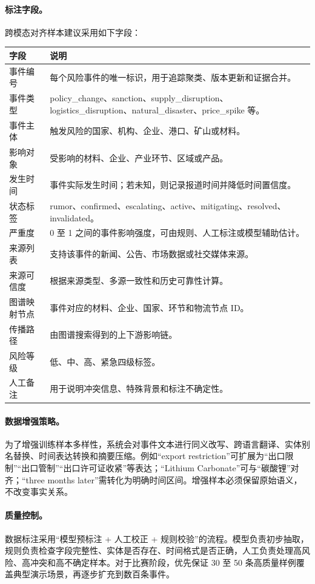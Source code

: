 ﻿\documentclass[12pt,a4paper]{article}
\begin{document}
\paragraph{标注字段。}跨模态对齐样本建议采用如下字段：
\begin{longtable}{p{}p{}}
\toprule
\textbf{字段} & \textbf{说明} \\
\midrule
事件编号 & 每个风险事件的唯一标识，用于追踪聚类、版本更新和证据合并。 \\
事件类型 & policy\_change、sanction、supply\_disruption、logistics\_disruption、natural\_disaster、price\_spike 等。 \\
事件主体 & 触发风险的国家、机构、企业、港口、矿山或材料。 \\
影响对象 & 受影响的材料、企业、产业环节、区域或产品。 \\
发生时间 & 事件实际发生时间；若未知，则记录报道时间并降低时间置信度。 \\
状态标签 & rumor、confirmed、escalating、active、mitigating、resolved、invalidated。 \\
严重度 & 0 至 1 之间的事件影响强度，可由规则、人工标注或模型辅助估计。 \\
来源列表 & 支持该事件的新闻、公告、市场数据或社交媒体来源。 \\
来源可信度 & 根据来源类型、多源一致性和历史可靠性计算。 \\
图谱映射节点 & 事件对应的材料、企业、国家、环节和物流节点 ID。 \\
传播路径 & 由图谱搜索得到的上下游影响链。 \\
风险等级 & 低、中、高、紧急四级标签。 \\
人工备注 & 用于说明冲突信息、特殊背景和标注不确定性。 \\
\bottomrule
\end{longtable}

\paragraph{数据增强策略。}为了增强训练样本多样性，系统会对事件文本进行同义改写、跨语言翻译、实体别名替换、时间表达转换和摘要压缩。例如“export restriction”可扩展为“出口限制”“出口管制”“出口许可证收紧”等表达；“Lithium Carbonate”可与“碳酸锂”对齐；“three months later”需转化为明确时间区间。增强样本必须保留原始语义，不改变事实关系。

\paragraph{质量控制。}数据标注采用“模型预标注 + 人工校正 + 规则校验”的流程。模型负责初步抽取，规则负责检查字段完整性、实体是否存在、时间格式是否正确，人工负责处理高风险、高冲突和高不确定样本。对于比赛阶段，优先保证 30 至 50 条高质量样例覆盖典型演示场景，再逐步扩充到数百条事件。
\end{document}

